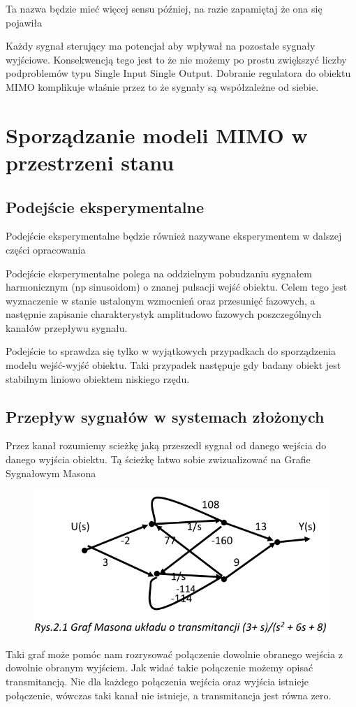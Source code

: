 \documentclass{article}
\begin{document}
	Ta nazwa będzie mieć więcej sensu później, na razie zapamiętaj że ona się pojawiła

	Każdy sygnał sterujący ma potencjał aby wpływał na pozostałe sygnały wyjściowe.
	Konsekwencją tego jest to że nie możemy po prostu zwiększyć liczby podproblemów
	typu Single Input Single Output. Dobranie regulatora do obiektu MIMO komplikuje
	właśnie przez to że sygnały są współzależne od siebie.

	\section{Sporządzanie modeli MIMO w przestrzeni stanu}

	\subsection{Podejście eksperymentalne}

		Podejście eksperymentalne będzie również nazywane eksperymentem w dalszej
		części opracowania

		Podejście eksperymentalne polega na oddzielnym pobudzaniu sygnałem harmonicznym
		(np sinusoidom) o znanej pulsacji wejść obiektu. Celem tego jest wyznaczenie w
		stanie ustalonym wzmocnień oraz przesunięć fazowych, a następnie zapisanie
		charakterystyk amplitudowo fazowych poszczególnych kanałów przepływu sygnału.

		Podejście to sprawdza się tylko w wyjątkowych przypadkach
		do sporządzenia modelu wejść-wyjść obiektu.
		Taki przypadek następuje gdy badany obiekt jest stabilnym liniowo
		obiektem niskiego rzędu.

	\subsection{Przepływ sygnałów w systemach złożonych}

		Przez kanał rozumiemy scieżkę jaką przeszedł sygnał od danego wejścia
		do danego wyjścia obiektu. Tą ścieżkę łatwo sobie zwizualizować na
		Grafie Sygnałowym Masona
		\begin{figure}
			\includegraphics{GrafMasona.png}
		\end{figure}
		Taki graf może pomóc nam rozrysować połączenie dowolnie obranego wejścia z
		dowolnie obranym wyjściem. Jak widać takie połączenie możemy opisać transmitancją.
		Nie dla każdego połączenia wejścia oraz wyjścia istnieje połączenie, wówczas taki
		kanał nie istnieje, a transmitancja jest równa zero.
\end{document}

